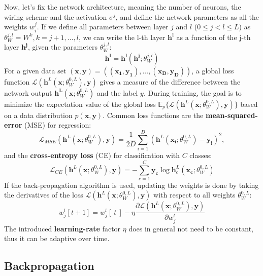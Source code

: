 \documentclass[main]{subfiles}
\begin{document}
	
	\noindent
	Now, let's fix the network architecture, meaning the number of neurons, the wiring scheme and the activation $\sigma^j$, and define the network parameters as all the weights $w_{i}^{j}$. If we define all parameters between layer $j$ and $l$ ($0 \leq j < l \leq L$) as $\theta^{j,l}_W = {W^k, k=j+1,...,l}$, we can write the l-th layer $\bm{h^l}$ as a function of the j-th layer $\bm{h^j}$, given the parameters $\theta^{j,l}_W$:
	\begin{equation}
	\bm{h^l} = \bm{h^l}(\bm{h^j}; \theta^{j,l}_W)
	\end{equation}
	For a given data set $(\bm{x}, \bm{y})=((\bm{x_1}, \bm{y_1}), ..., (\bm{x_D}, \bm{y_D}))$, a global loss function $\mathcal{L}(\bm{h}^L(\bm{x}; \theta^{0,L}_W), \bm{y})$ gives a measure of the difference between the network output $\bm{h^L}(\bm{x}; \theta^{0,L}_W)$ and the label $y$. During training, the goal is to minimize the expectation value of the global loss $\mathbb{E}_p\{\mathcal{L}(\bm{h}^L(\bm{x}; \theta^{0,L}_W), \bm{y}) \}$ based on a data distribution $p(\bm{x}, \bm{y})$. Common loss functions are the \textbf{mean-squared-error} (MSE) for regression:
	\begin{equation}
	\mathcal{L}_{MSE}(\bm{h}^L(\bm{x}; \theta^{0,L}_W), \bm{y}) = \frac{1}{2D} \sum_{i=1}^D(\bm{h}^L(\bm{x_i}; \theta^{0,L}_W) - \bm{y_i})^2,
	\end{equation}
	and the \textbf{cross-entropy loss} (CE) for classification with $C$ classes:
	\begin{equation}
	\mathcal{L}_{CE}(\bm{h}^L(\bm{x}; \theta^{0,L}_W), \bm{y}) = - \sum_{c=1}^C \bm{y_c} \log{\bm{h}_c^{L}(\bm{x_c}; \theta^{0,L}_W)} 
	\end{equation}
	\noindent
	If the back-propagation algorithm is used, updating the weights is done by taking the derivatives of the loss $\mathcal{L}(\bm{h}^L(\bm{x}; \theta^{0,L}_W), \bm{y})$ with respect to all weights $\theta^{0,L}_W$: 
	\begin{equation}
	w_j^{l}[t+1] = w_j^{l}[\ t\ ] - \eta \frac{\partial \mathcal{L}(\bm{h}^L(\bm{x}; \theta^{0,L}_W), \bm{y}) }{\partial w_j^{l}}
	\end{equation}
	The introduced \textbf{learning-rate} factor $\eta$ does in general not need to be constant, thus it can be adaptive over time. 
	
\subsection{Backpropagation}
\end{document}
